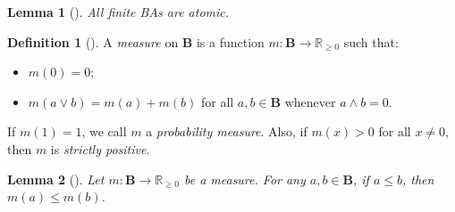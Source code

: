 \documentclass{article}
\newtheorem{lemma}{Lemma}
\theoremstyle{definition}
\newtheorem{definition}{Definition}
\theoremstyle{remark}
\begin{document}
\begin{lemma}[\cite{givant2008introduction}] \label{lemma:atomic}
  All finite BAs are atomic.
\end{lemma}

\begin{definition}[\cite{gaifman1964concerning,DBLP:books/daglib/0090259}] \label{def:measure}
  A \emph{measure} on $\mathbf{B}$ is a function $m\colon
  \mathbf{B} \to \mathbb{R}_{\ge 0}$ such that:
  \begin{itemize}
  \item $m(0) = 0$;
  \item $m(a \lor b) = m(a) + m(b)$ for all $a, b \in \mathbf{B}$ whenever $a
    \land b = 0$.
  \end{itemize}
  If $m(1) = 1$, we call $m$ a \emph{probability measure}. Also, if $m(x) > 0$
  for all $x \ne 0$, then $m$ is \emph{strictly positive}.
\end{definition}

\begin{lemma}[\cite{horn1948measures}] \label{lemma:m_and_order}
  Let $m: \mathbf{B} \to \mathbb{R}_{\ge 0}$ be a measure. For any $a, b \in
  \mathbf{B}$, if $a \le b$, then $m(a) \le m(b)$.
\end{lemma}

\end{document}
